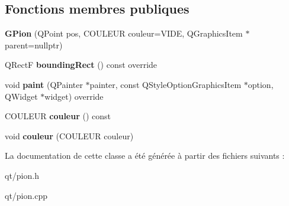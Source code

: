 \subsection*{Fonctions membres publiques}
\begin{DoxyCompactItemize}
\item 
{\bfseries G\+Pion} (Q\+Point pos, C\+O\+U\+L\+E\+UR couleur=V\+I\+DE, Q\+Graphics\+Item $\ast$parent=nullptr)\hypertarget{classGPion_a75b88ad1959336d75f98ba87f6e2cdd8}{}\label{classGPion_a75b88ad1959336d75f98ba87f6e2cdd8}

\item 
Q\+RectF {\bfseries bounding\+Rect} () const override\hypertarget{classGPion_a29667d41cfb377ea743b76ff038e8eff}{}\label{classGPion_a29667d41cfb377ea743b76ff038e8eff}

\item 
void {\bfseries paint} (Q\+Painter $\ast$painter, const Q\+Style\+Option\+Graphics\+Item $\ast$option, Q\+Widget $\ast$widget) override\hypertarget{classGPion_ac008a9f29a655088d0995186fae05708}{}\label{classGPion_ac008a9f29a655088d0995186fae05708}

\item 
C\+O\+U\+L\+E\+UR {\bfseries couleur} () const \hypertarget{classGPion_acddca7f68917a7c84defeb9c60fabff1}{}\label{classGPion_acddca7f68917a7c84defeb9c60fabff1}

\item 
void {\bfseries couleur} (C\+O\+U\+L\+E\+UR couleur)\hypertarget{classGPion_a32724d032262f581595937497b607ad8}{}\label{classGPion_a32724d032262f581595937497b607ad8}

\end{DoxyCompactItemize}


La documentation de cette classe a été générée à partir des fichiers suivants \+:\begin{DoxyCompactItemize}
\item 
qt/pion.\+h\item 
qt/pion.\+cpp\end{DoxyCompactItemize}
